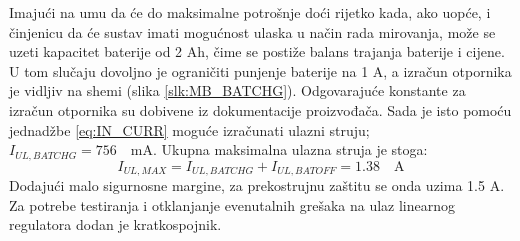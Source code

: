Imajući na umu da će do maksimalne potrošnje doći rijetko kada, ako uopće, i činjenicu da će sustav imati mogućnost ulaska u način rada mirovanja, može se uzeti kapacitet baterije od 2 Ah, čime se postiže balans trajanja baterije i cijene. U tom slučaju dovoljno je ograničiti punjenje baterije na 1 A, a izračun otpornika je vidljiv na shemi (slika \ref{slk:MB_BATCHG}). Odgovarajuće konstante za izračun otpornika su dobivene iz dokumentacije proizvođača. Sada je isto pomoću jednadžbe \ref{eq:IN_CURR} moguće izračunati ulazni struju; ${I_{UL,BATCHG} = 756\quad \textrm{mA}}$. Ukupna maksimalna ulazna struja je stoga:
\begin{equation}
    I_{UL,MAX}=I_{UL,BATCHG}+I_{UL,BATOFF} = 1.38\quad \textrm{A}
\end{equation}
Dodajući malo sigurnosne margine, za prekostrujnu zaštitu se onda uzima 1.5 A. Za potrebe testiranja i otklanjanje evenutalnih grešaka na ulaz linearnog regulatora dodan je kratkospojnik.

